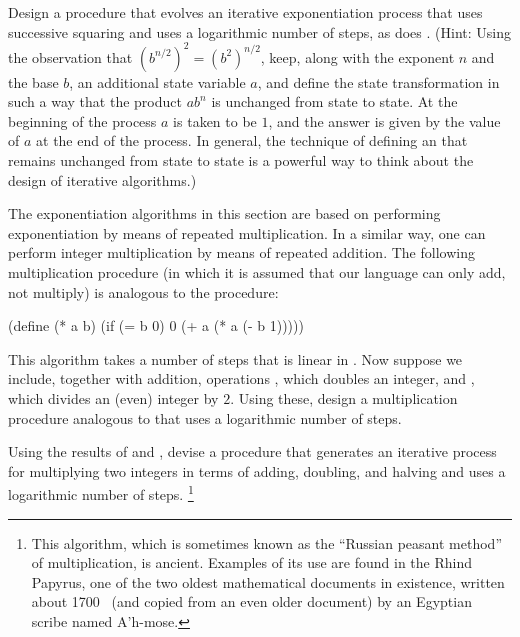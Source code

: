 \begin{exercise}
	\label{Exercise 1.16}
	Design a procedure that evolves an iterative exponentiation process that uses successive squaring and uses a logarithmic number of steps, as does .
	(Hint:
	Using the observation that \( (b^{n / 2})^2 = (b^2)^{n / 2} \), keep, along with the exponent \( n \) and the base \( b \), an additional state variable \( a \), and define the state transformation in such a way that the product \( a b^n \) is unchanged from state to state.
	At the beginning of the process \( a \) is taken to be \( 1 \), and the answer is given by the value of \( a \) at the end of the process.
	In general, the technique of defining an  that remains unchanged from state to state is a powerful way to think about the design of iterative algorithms.)
\end{exercise}



\begin{exercise}
	\label{Exercise 1.17}
	The exponentiation algorithms in this section are based on performing exponentiation by means of repeated multiplication.
	In a similar way, one can perform integer multiplication by means of repeated addition.
	The following multiplication procedure (in which it is assumed that our language can only add, not multiply) is analogous to the  procedure:
	\begin{scheme}
	  (define (* a b)
	    (if (= b 0)
	        0
	        (+ a (* a (- b 1)))))
	\end{scheme}
	This algorithm takes a number of steps that is linear in .
	Now suppose we include, together with addition, operations , which doubles an integer, and , which divides an (even) integer by \( 2 \).
	Using these, design a multiplication procedure analogous to  that uses a logarithmic number of steps.
\end{exercise}



\begin{exercise}
	\label{Exercise 1.18}
	Using the results of  and , devise a procedure that generates an iterative process for multiplying two integers in terms of adding, doubling, and halving and uses a logarithmic number of steps.%
	\footnote{
		This algorithm, which is sometimes known as the “Russian peasant method” of multiplication, is ancient.
		Examples of its use are found in the Rhind Papyrus, one of the two oldest mathematical documents in existence, written about 1700~ (and copied from an even older document) by an Egyptian scribe named A’h-mose.
	}
\end{exercise}



